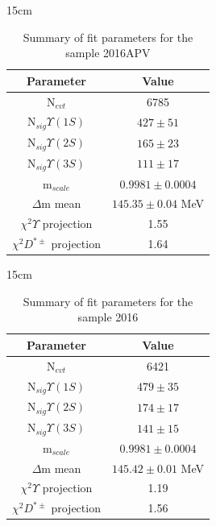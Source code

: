 \begin{table}[!htbp]{15cm}
  \caption{Summary of fit parameters for the sample 2016APV}\label{tab:fit_summary_2016APV}
  \begin{tabular}{ c | c }
    Parameter                    & Value                 \\
    \hline
    N$_{evt}$                    & 6785                  \\ \hline
    N$_{sig} \Upsilon(1S)$       & $427 \pm 51$          \\ \hline
    N$_{sig} \Upsilon(2S)$       & $165 \pm 23$          \\ \hline
    N$_{sig} \Upsilon(3S)$       & $111 \pm 17$          \\ \hline
    m$_{scale}$                  & $0.9981 \pm 0.0004$   \\ \hline
    $\Delta$m mean               & $145.35 \pm 0.04$ MeV \\ \hline
    $\chi^2 \Upsilon$ projection & 1.55                  \\ \hline
    $\chi^2 D^{*\pm}$ projection & 1.64                  \\ \hline
  \end{tabular}
\end{table}

\begin{table}[!htbp]{15cm}
  \caption{Summary of fit parameters for the sample 2016}\label{tab:fit_summary_2016}
  \begin{tabular}{ c | c }
    Parameter                    & Value                 \\
    \hline
    N$_{evt}$                    & 6421                  \\ \hline
    N$_{sig} \Upsilon(1S)$       & $479 \pm 35$          \\ \hline
    N$_{sig} \Upsilon(2S)$       & $174 \pm 17$          \\ \hline
    N$_{sig} \Upsilon(3S)$       & $141 \pm 15$          \\ \hline
    m$_{scale}$                  & $0.9981 \pm 0.0004$   \\ \hline
    $\Delta$m mean               & $145.42 \pm 0.01$ MeV \\ \hline
    $\chi^2 \Upsilon$ projection & 1.19                  \\ \hline
    $\chi^2 D^{*\pm}$ projection & 1.56                  \\ \hline
  \end{tabular}
\end{table}

